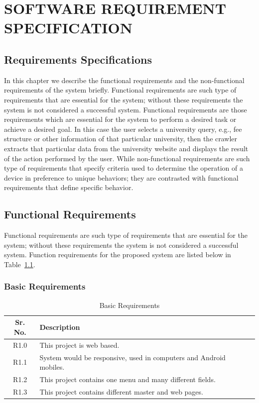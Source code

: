 \chapter{SOFTWARE REQUIREMENT SPECIFICATION}

\section{Requirements Specifications}

In this chapter we describe the functional requirements and the non-functional requirements of the system briefly. Functional requirements are such type of requirements that are essential for the system; without these requirements the system is not considered a successful system. Functional requirements are those requirements which are essential for the system to perform a desired task or achieve a desired goal. In this case the user selects a university query, e.g., fee structure or other information of that particular university, then the crawler extracts that particular data from the university website and displays the result of the action performed by the user. While non-functional requirements are such type of requirements that specify criteria used to determine the operation of a device in preference to unique behaviors; they are contrasted with functional requirements that define specific behavior.

\section{Functional Requirements}

Functional requirements are such type of requirements that are essential for the system; without these requirements the system is not considered a successful system. Function requirements for the proposed system are listed below in Table~\ref{tab:basic_req}.

\subsection{Basic Requirements}

\begin{table}[H]
\centering
\caption{Basic Requirements}
\label{tab:basic_req}
\begin{tabularx}{\textwidth}{|c|X|}
\hline
\textbf{Sr. No.} & \textbf{Description} \\
\hline
R1.0 & This project is web based. \\
\hline
R1.1 & System would be responsive, used in computers and Android mobiles. \\
\hline
R1.2 & This project contains one menu and many different fields. \\
\hline
R1.3 & This project contains different master and web pages. \\
\hline
\end{tabularx}
\end{table}

